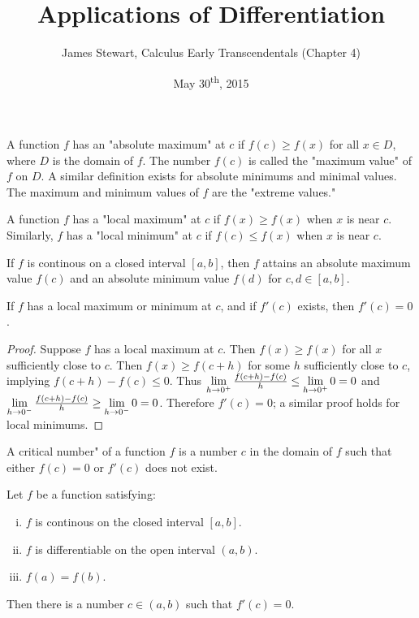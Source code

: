 \documentclass[a4paper,11pt]{article}
\title{Applications of Differentiation}
\author{James Stewart, Calculus Early Transcendentals (Chapter 4)}
\date{May 30\textsuperscript{th}, 2015}
\begin{document}
\maketitle
{}

\begin{outline}

    A function \(f\) has an "absolute maximum" at \(c\) if \(f(c) \geq f(x)\) for all \(x \in D\), where \(D\) is the
    domain of \(f\). The number \(f(c)\) is called the "maximum value" of \(f\) on \(D\). A similar definition exists
    for absolute minimums and minimal values. The maximum and minimum values of \(f\) are the "extreme values."
    
    A function \(f\) has a "local maximum" at \(c\) if \(f(x) \geq f(x)\) when \(x\) is near \(c\). Similarly, \(f\)
    has a "local minimum" at \(c\) if \(f(c) \leq f(x)\) when \(x\) is near \(c\).
    
    If \(f\) is continous on a closed interval \([a, b]\), then \(f\) attains an absolute maximum value \(f(c)\) and
    an absolute minimum value \(f(d)\) for \(c,d \in [a, b]\).
    
    If \(f\) has a local maximum or minimum at \(c\), and if \(f'(c)\) exists, then \(f'(c) = 0\).
    
    \begin{proof}
      Suppose \(f\) has a local maximum at \(c\). Then \(f(x) \geq f(x)\) for all \(x\) sufficiently close to \(c\).
      Then \(f(x)\geq f(c+h)\) for some \(h\) sufficiently close to \(c\), implying \(f(c+h)-f(c)\leq 0\). Thus
      \(\xlimit[+]{h}{0} \frac{f(c+h)-f(c)}{h} \leq \xlimit[+]{h}{0} 0 = 0\) and \(\xlimit[-]{h}{0} \frac{f(c+h)-f(c)}
      {h} \geq \xlimit[-]{h}{0} 0 = 0\). Therefore \(f'(c)=0\); a similar proof holds for local minimums.
    \end{proof}
    
    A critical number" of a function \(f\) is a number \(c\) in the domain of \(f\) such that either \(f(c)=0\)
    or \(f'(c)\) does not exist.
    
    Let \(f\) be a function satisfying:
    \begin{enumerate}[i.]
      \item \(f\) is continous on the closed interval \([a, b]\).
      \item \(f\) is differentiable on the open interval \((a, b)\).
      \item \(f(a) = f(b)\).
    \end{enumerate}
    Then there is a number \(c \in (a, b)\) such that \(f'(c) = 0\).


\end{outline}
\end{document}
